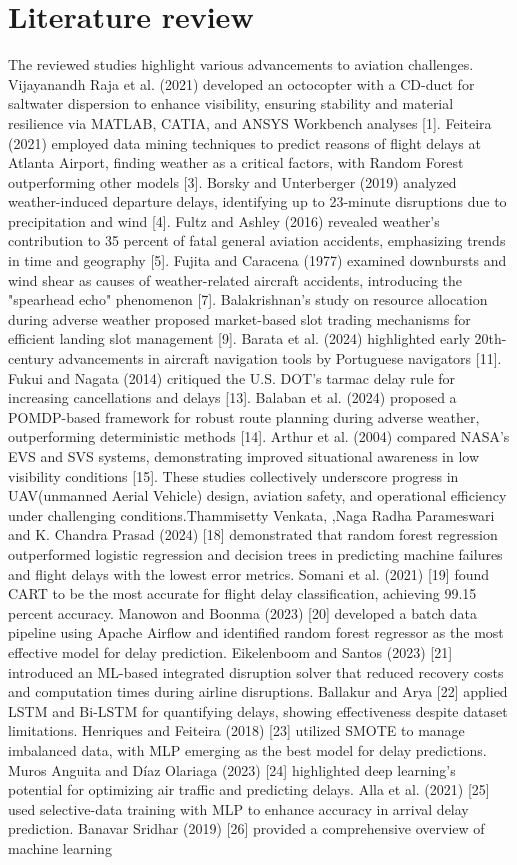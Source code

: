 \documentclass[conference]{IEEEtran}
\begin{document}
\section{Literature review}
The reviewed studies highlight various advancements  to aviation challenges. Vijayanandh Raja et al. (2021) developed an octocopter with a CD-duct for saltwater dispersion to enhance visibility, ensuring stability and material resilience via MATLAB, CATIA, and ANSYS Workbench analyses [1]. Feiteira (2021) employed data mining techniques to predict reasons of flight delays at Atlanta Airport, finding weather  as a critical factors, with Random Forest outperforming other models [3]. Borsky and Unterberger (2019) analyzed weather-induced departure delays, identifying up to 23-minute disruptions due to precipitation and wind [4]. Fultz and Ashley (2016) revealed weather's contribution to 35 percent of fatal general aviation accidents, emphasizing trends in time and geography [5]. Fujita and Caracena (1977) examined downbursts and wind shear as causes of weather-related aircraft accidents, introducing the "spearhead echo" phenomenon [7]. Balakrishnan’s study on resource allocation during adverse weather proposed market-based slot trading mechanisms for efficient landing slot management [9]. Barata et al. (2024) highlighted early 20th-century advancements in aircraft navigation tools by Portuguese navigators [11]. Fukui and Nagata (2014) critiqued the U.S. DOT's tarmac delay rule for increasing cancellations and delays [13]. Balaban et al. (2024) proposed a POMDP-based framework for robust route planning during adverse weather, outperforming deterministic methods [14]. Arthur et al. (2004) compared NASA’s EVS and SVS systems, demonstrating improved situational awareness in low visibility conditions [15]. These studies collectively underscore progress in UAV(unmanned Aerial Vehicle) design, aviation safety, and operational efficiency under challenging conditions.Thammisetty Venkata, ,Naga Radha Parameswari and K. Chandra Prasad (2024) [18] demonstrated that random forest regression outperformed logistic regression and decision trees in predicting machine failures and flight delays with the lowest error metrics. Somani et al. (2021) [19] found CART to be the most accurate for flight delay classification, achieving 99.15 percent accuracy. Manowon and Boonma (2023) [20] developed a batch data pipeline using Apache Airflow and identified random forest regressor as the most effective model for delay prediction. Eikelenboom and Santos (2023) [21] introduced an ML-based integrated disruption solver that reduced recovery costs and computation times during airline disruptions. Ballakur and Arya [22] applied LSTM and Bi-LSTM for quantifying delays, showing effectiveness despite dataset limitations. Henriques and Feiteira (2018) [23] utilized SMOTE to manage imbalanced data, with MLP emerging as the best model for delay predictions. Muros Anguita and Díaz Olariaga (2023) [24] highlighted deep learning's potential for optimizing air traffic and predicting delays. Alla et al. (2021) [25] used selective-data training with MLP to enhance accuracy in arrival delay prediction. Banavar Sridhar (2019) [26] provided a comprehensive overview of machine learning 
\end{document}
